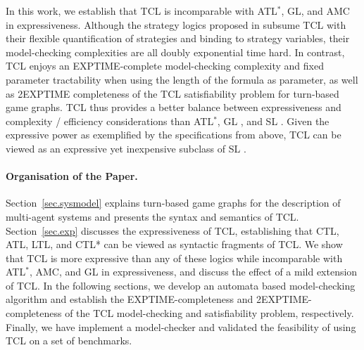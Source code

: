 \documentclass{llncs}
\newcommand{\pfrr}{\Box}
\begin{document}

In this work, we establish that TCL is incomparable with ATL$^*$, GL, and AMC in expressiveness.  
Although the strategy logics proposed in \cite{BBGK07,CHP10,CLM10,MMV10} subsume TCL with their flexible quantification of strategies and binding to strategy variables, 
their model-checking complexities are all doubly exponential time hard.  
In contrast, TCL enjoys an EXPTIME-complete model-checking complexity and fixed parameter tractability when using the length of the formula as parameter, as well as 2EXPTIME completeness of the TCL satisfiability problem for turn-based game graphs.  
TCL thus provides a better balance between expressiveness and complexity / efficiency considerations 
than ATL$^*$, GL \cite{AHK02}, and SL \cite{CHP10,MMV10,MMPV12}.
Given the expressive power as exemplified by the specifications from above, TCL can be viewed as an expressive yet inexpensive subclass of SL \cite{MMV10,MMPV12}.  

\paragraph{\bf Organisation of the Paper.}
Section~\ref{sec.sysmodel} explains turn-based game graphs for the description of multi-agent systems and presents the syntax and semantics of TCL.
Section~\ref{sec.exp} discusses the expressiveness of TCL, establishing that CTL, ATL, LTL, and CTL* can be viewed as syntactic fragments of TCL.
We show that TCL is more expressive than any of these logics while incomparable with ATL$^*$, AMC, and GL \cite{AHK02} in expressiveness, and discuss the effect of a mild extension of TCL. 
In the following sections, we develop an automata based model-checking algorithm and establish the EXPTIME-completeness and 2EXPTIME-completeness of the TCL model-checking and satisfiability problem, respectively.
Finally, we have implement a model-checker and validated the feasibility of using TCL on a set of benchmarks.
\end{document}
